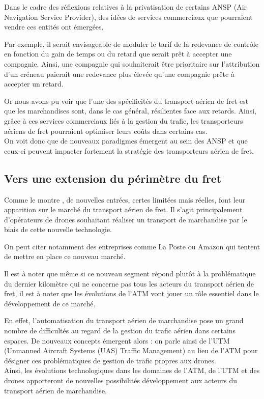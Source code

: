 Dans le cadre des réflexions relatives à la privatisation de certains ANSP (Air Navigation Service Provider), des idées de services commerciaux que pourraient vendre ces entités ont émergées.

Par exemple, il serait envisageable de moduler le tarif de la redevance de contrôle en fonction du gain de temps ou du retard que serait prêt à accepter une compagnie. Ainsi, une compagnie qui souhaiterait être prioritaire sur l'attribution d'un créneau paierait une redevance plus élevée qu'une compagnie prête à accepter un retard.

Or nous avons pu voir que l'une des spécificités du transport aérien de fret est que les marchandises sont, dans le cas général, résilientes face aux retards. Ainsi, grâce à ces services commerciaux liés à la gestion du trafic, les transporteurs aériens de fret pourraient optimiser leurs coûts dans certains cas.\\

On voit donc que de nouveaux paradigmes émergent au sein des ANSP et que ceux-ci peuvent impacter fortement la stratégie des transporteurs aérien de fret.

\subsection{Vers une extension du périmètre du fret}


Comme le montre \cite{RePEc:eee:jaitra:v:61:y:2017:i:c:p:34-40}, de nouvelles entrées, certes limitées mais réelles, font leur apparition sur le marché du transport aérien de fret. Il s'agit principalement d'opérateurs de drones souhaitant réaliser un transport de marchandise par le biais de cette nouvelle technologie.

On peut citer notamment des entreprises comme La Poste \cite{gradt_2016} ou Amazon \cite{figaro_2016} qui tentent de mettre en place ce nouveau marché.

Il est à noter que même si ce nouveau segment répond plutôt à la problématique du dernier kilomètre qui ne concerne pas tous les acteurs du transport aérien de fret, il est à noter que les évolutions de l'ATM vont jouer un rôle essentiel dans le développement de ce marché.

En effet, l'automatisation du transport aérien de marchandise pose un grand nombre de difficultés au regard de la gestion du trafic aérien dans certains espaces. De nouveaux concepts émergent alors : on parle ainsi de l'UTM (Unmanned Aircraft Systems (UAS) Traffic Management) au lieu de l'ATM pour désigner ces problématiques de gestion de trafic propres aux drones.\\ 

Ainsi, les évolutions technologiques dans les domaines de l'ATM, de l'UTM et des drones apporteront de nouvelles possibilités développement aux acteurs du transport aérien de marchandise.





